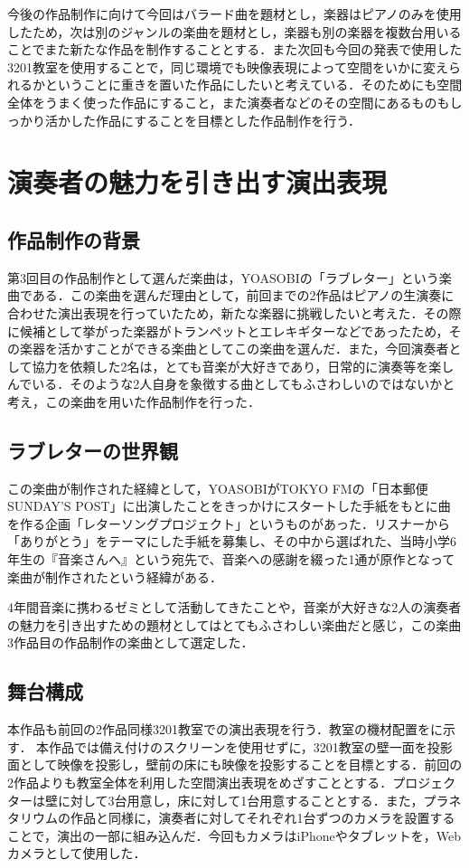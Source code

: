 今後の作品制作に向けて今回はバラード曲を題材とし，楽器はピアノのみを使用したため，次は別のジャンルの楽曲を題材とし，楽器も別の楽器を複数台用いることでまた新たな作品を制作することとする．また次回も今回の発表で使用した3201教室を使用することで，同じ環境でも映像表現によって空間をいかに変えられるかということに重きを置いた作品にしたいと考えている．そのためにも空間全体をうまく使った作品にすること，また演奏者などのその空間にあるものもしっかり活かした作品にすることを目標とした作品制作を行う．


\section{演奏者の魅力を引き出す演出表現}
\subsection{作品制作の背景}
第3回目の作品制作として選んだ楽曲は，YOASOBIの「ラブレター」\cite{loveletter}という楽曲である．この楽曲を選んだ理由として，前回までの2作品はピアノの生演奏に合わせた演出表現を行っていたため，新たな楽器に挑戦したいと考えた．その際に候補として挙がった楽器がトランペットとエレキギターなどであったため，その楽器を活かすことができる楽曲としてこの楽曲を選んだ．また，今回演奏者として協力を依頼した2名は，とても音楽が大好きであり，日常的に演奏等を楽しんでいる．そのような2人自身を象徴する曲としてもふさわしいのではないかと考え，この楽曲を用いた作品制作を行った．

\subsection{ラブレターの世界観}
この楽曲が制作された経緯として，YOASOBIがTOKYO FMの「日本郵便 SUNDAY’S POST」に出演したことをきっかけにスタートした手紙をもとに曲を作る企画「レターソングプロジェクト」\cite{lettersong}というものがあった．リスナーから「ありがとう」をテーマにした手紙を募集し、その中から選ばれた、当時小学6年生の『音楽さんへ』という宛先で、音楽への感謝を綴った1通が原作となって楽曲が制作されたという経緯がある．

4年間音楽に携わるゼミとして活動してきたことや，音楽が大好きな2人の演奏者の魅力を引き出すための題材としてはとてもふさわしい楽曲だと感じ，この楽曲3作品目の作品制作の楽曲として選定した．

\subsection{舞台構成}
本作品も前回の2作品同様3201教室での演出表現を行う．教室の機材配置をに示す．
本作品では備え付けのスクリーンを使用せずに，3201教室の壁一面を投影面として映像を投影し，壁前の床にも映像を投影することを目標とする．前回の2作品よりも教室全体を利用した空間演出表現をめざすこととする．プロジェクターは壁に対して3台用意し，床に対して1台用意することとする．また，プラネタリウムの作品と同様に，演奏者に対してそれぞれ1台ずつのカメラを設置することで，演出の一部に組み込んだ．今回もカメラはiPhoneやタブレットを，Webカメラとして使用した．


